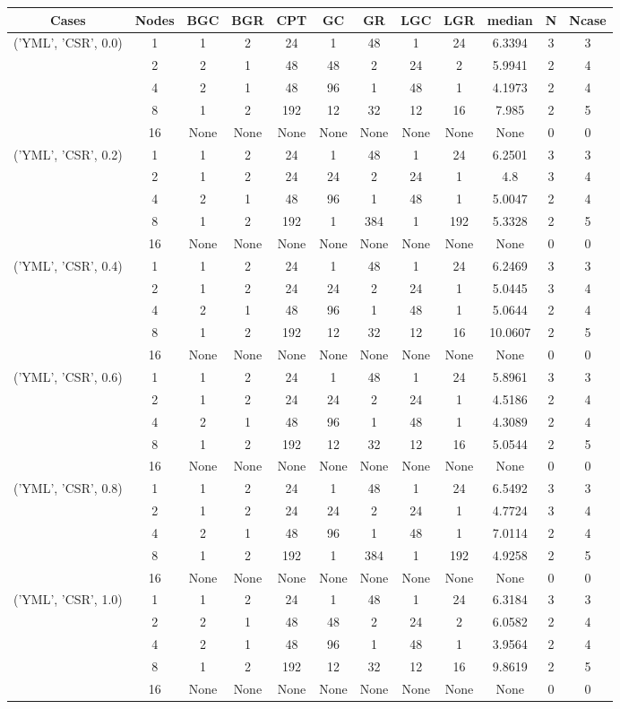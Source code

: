 \begin{tabular}{cccccccccccc}
\hline
Cases & Nodes& BGC& BGR& CPT& GC& GR& LGC& LGR& median & N & Ncase \\
\hline
\multirow{5}{*}{('YML', 'CSR', 0.0)}& 1& 1& 2& 24& 1& 48& 1& 24& 6.3394& 3& 3\\
& 2& 2& 1& 48& 48& 2& 24& 2& 5.9941& 2& 4\\
& 4& 2& 1& 48& 96& 1& 48& 1& 4.1973& 2& 4\\
& 8& 1& 2& 192& 12& 32& 12& 16& 7.985& 2& 5\\
& 16& None& None& None& None& None& None& None& None& 0& 0\\
\hline
\multirow{5}{*}{('YML', 'CSR', 0.2)}& 1& 1& 2& 24& 1& 48& 1& 24& 6.2501& 3& 3\\
& 2& 1& 2& 24& 24& 2& 24& 1& 4.8& 3& 4\\
& 4& 2& 1& 48& 96& 1& 48& 1& 5.0047& 2& 4\\
& 8& 1& 2& 192& 1& 384& 1& 192& 5.3328& 2& 5\\
& 16& None& None& None& None& None& None& None& None& 0& 0\\
\hline
\multirow{5}{*}{('YML', 'CSR', 0.4)}& 1& 1& 2& 24& 1& 48& 1& 24& 6.2469& 3& 3\\
& 2& 1& 2& 24& 24& 2& 24& 1& 5.0445& 3& 4\\
& 4& 2& 1& 48& 96& 1& 48& 1& 5.0644& 2& 4\\
& 8& 1& 2& 192& 12& 32& 12& 16& 10.0607& 2& 5\\
& 16& None& None& None& None& None& None& None& None& 0& 0\\
\hline
\multirow{5}{*}{('YML', 'CSR', 0.6)}& 1& 1& 2& 24& 1& 48& 1& 24& 5.8961& 3& 3\\
& 2& 1& 2& 24& 24& 2& 24& 1& 4.5186& 2& 4\\
& 4& 2& 1& 48& 96& 1& 48& 1& 4.3089& 2& 4\\
& 8& 1& 2& 192& 12& 32& 12& 16& 5.0544& 2& 5\\
& 16& None& None& None& None& None& None& None& None& 0& 0\\
\hline
\multirow{5}{*}{('YML', 'CSR', 0.8)}& 1& 1& 2& 24& 1& 48& 1& 24& 6.5492& 3& 3\\
& 2& 1& 2& 24& 24& 2& 24& 1& 4.7724& 3& 4\\
& 4& 2& 1& 48& 96& 1& 48& 1& 7.0114& 2& 4\\
& 8& 1& 2& 192& 1& 384& 1& 192& 4.9258& 2& 5\\
& 16& None& None& None& None& None& None& None& None& 0& 0\\
\hline
\multirow{5}{*}{('YML', 'CSR', 1.0)}& 1& 1& 2& 24& 1& 48& 1& 24& 6.3184& 3& 3\\
& 2& 2& 1& 48& 48& 2& 24& 2& 6.0582& 2& 4\\
& 4& 2& 1& 48& 96& 1& 48& 1& 3.9564& 2& 4\\
& 8& 1& 2& 192& 12& 32& 12& 16& 9.8619& 2& 5\\
& 16& None& None& None& None& None& None& None& None& 0& 0\\
\hline
\end{tabular}


